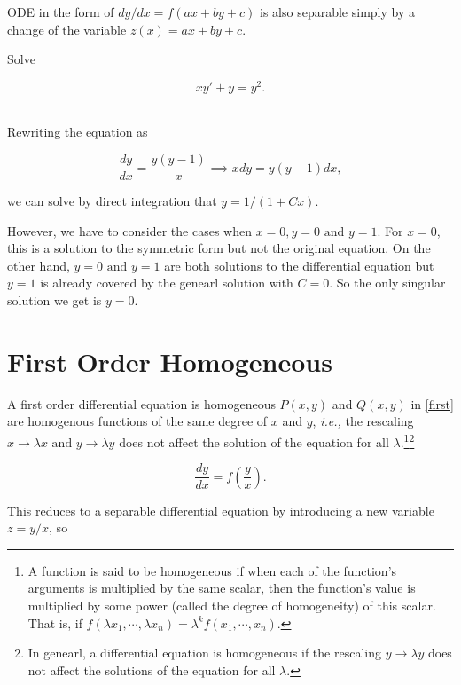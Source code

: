 \documentclass[english,a4paper,12pt]{report}
\begin{document}
ODE in the form of \(dy /dx = f(ax+by+c)\) is also separable simply by a change of the variable \(z(x) = ax + by + c\).

{Solve 

\begin{equation}
    xy'+y=y^2.
\end{equation}~
}
{Rewriting the equation as 

\begin{equation}
    \frac{dy}{dx} = \frac{y(y-1)}{x} \implies xdy = y(y-1)dx,
\end{equation}

we can solve by direct integration that \(y = 1 / (1+Cx)  \). 

However, we have to consider the cases when \(x = 0, y = 0 \text { and } y = 1\). For \(x = 0\), this is a solution to the symmetric form but not the original equation. On the other hand, \(y=0\text { and } y=1\) are both solutions to the differential equation but \(y = 1\) is already covered by the genearl solution with \(C = 0\). So the only singular solution we get is \(y = 0\).    
} 


\section{First Order Homogeneous} \label{homo} 

A first order differential equation is homogeneous \(P(x,y)\) and \(Q(x,y)\) in \cref{first} are homogenous functions of the same degree of \(x\) and \(y\), \textit{i.e.,} the rescaling \(x \to \lambda x \text { and } y \to \lambda y\) does not affect the solution of the equation for all \(\lambda \).\footnote{A function is said to be homogeneous if when each of the function's arguments is multiplied by the same scalar, then the function's value is multiplied by some power (called the degree of homogeneity) of this scalar. That is, if \(f(\lambda x_1 ,\cdots, \lambda x_{n} ) = \lambda  ^{k} f(x_1 ,\cdots,x_{n} )  \).  }\footnote{In genearl, a differential equation is homogeneous if the rescaling \(y \to  \lambda y\) does not affect the solutions of the equation for all \(\lambda \).} 

\begin{equation}
    \frac{dy}{dx} = f\left(\frac{y}{x} \right).
\end{equation}

This reduces to a separable differential equation by introducing a new variable \( z = y /x \), so
\end{document}

